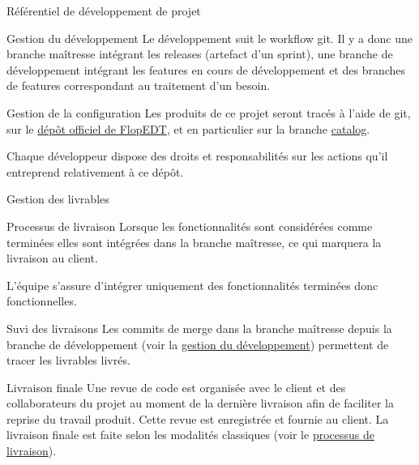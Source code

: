 \documentclass[]{article}
\begin{document}
{\begin{section}{\label{sec:Référentiel de développement de projet}Référentiel de développement de projet}
     \begin{subsection}{\label{sec:Gestion du développement}Gestion du développement}
         Le développement suit le workflow git. Il y a donc une branche maîtresse intégrant les releases (artefact d’un sprint), une branche de développement intégrant les features en cours de développement et des branches de features correspondant au traitement d’un besoin.
     \end{subsection}

     \begin{subsection}{\label{sec:Gestion de la configuration}Gestion de la configuration}
         Les produits de ce projet seront tracés à l'aide de git, sur le \href{https://framagit.org/flopedt/FlOpEDT}{dépôt officiel de FlopEDT}, et en particulier sur la branche \href{https://framagit.org/flopedt/FlOpEDT/-/tree/catalog}{catalog}.

         Chaque développeur dispose des droits et responsabilités sur les actions qu'il entreprend relativement à ce dépôt.
     \end{subsection}

     \begin{subsection}{\label{sec:Gestion des livrables}Gestion des livrables}
         \begin{subsubsection}{\label{sec:Processus de livraison}Processus de livraison}
             Lorsque les fonctionnalités sont considérées comme terminées elles sont intégrées dans la branche maîtresse, ce qui marquera la livraison au client.

             L’équipe s’assure d’intégrer uniquement des fonctionnalités terminées donc fonctionnelles.
         \end{subsubsection}

         \begin{subsubsection}{\label{sec:Suvi des livraisons}Suvi des livraisons}
             Les commits de merge dans la branche maîtresse depuis la branche de développement (voir la \hyperref[sec:Gestion du développement]{gestion du développement}) permettent de tracer les livrables livrés.
         \end{subsubsection}

         \begin{subsubsection}{\label{sec:Livraison finale}Livraison finale}
             Une revue de code est organisée avec le client et des collaborateurs du projet au moment de la dernière livraison afin de faciliter la reprise du travail produit. Cette revue est enregistrée et fournie au client. La livraison finale est faite selon les modalités classiques (voir le \hyperref[sec:Processus de livraison]{processus de livraison}).
         \end{subsubsection}
     \end{subsection}


\end{section}}
\end{document}
